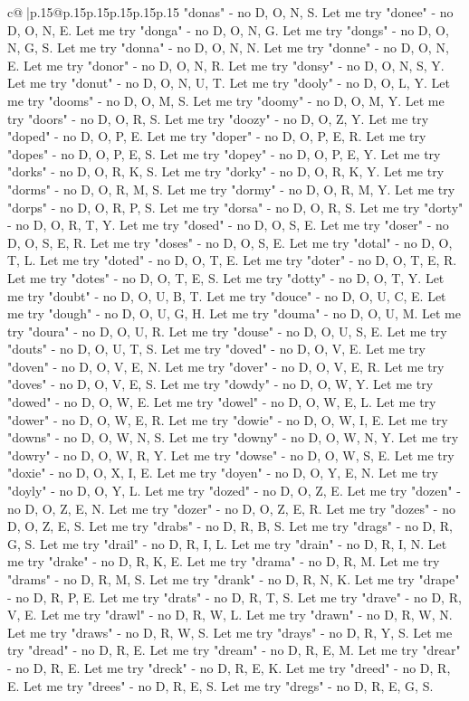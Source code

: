 \documentclass{article}
\begin{document}
{\begin{supertabular}{c@{$\;$}|p{.15\linewidth}@{}p{.15\linewidth}p{.15\linewidth}p{.15\linewidth}p{.15\linewidth}p{.15\linewidth}}
{{{"donas" {-} no D, O, N, S. Let me try "donee" {-} no D, O, N, E. Let me try "donga" {-} no D, O, N, G. Let me try "dongs" {-} no D, O, N, G, S. Let me try "donna" {-} no D, O, N, N. Let me try "donne" {-} no D, O, N, E. Let me try "donor" {-} no D, O, N, R. Let me try "donsy" {-} no D, O, N, S, Y. Let me try "donut" {-} no D, O, N, U, T. Let me try "dooly" {-} no D, O, L, Y. Let me try "dooms" {-} no D, O, M, S. Let me try "doomy" {-} no D, O, M, Y. Let me try "doors" {-} no D, O, R, S. Let me try "doozy" {-} no D, O, Z, Y. Let me try "doped" {-} no D, O, P, E. Let me try "doper" {-} no D, O, P, E, R. Let me try "dopes" {-} no D, O, P, E, S. Let me try "dopey" {-} no D, O, P, E, Y. Let me try "dorks" {-} no D, O, R, K, S. Let me try "dorky" {-} no D, O, R, K, Y. Let me try "dorms" {-} no D, O, R, M, S. Let me try "dormy" {-} no D, O, R, M, Y. Let me try "dorps" {-} no D, O, R, P, S. Let me try "dorsa" {-} no D, O, R, S. Let me try "dorty" {-} no D, O, R, T, Y. Let me try "dosed" {-} no D, O, S, E. Let me try "doser" {-} no D, O, S, E, R. Let me try "doses" {-} no D, O, S, E. Let me try "dotal" {-} no D, O, T, L. Let me try "doted" {-} no D, O, T, E. Let me try "doter" {-} no D, O, T, E, R. Let me try "dotes" {-} no D, O, T, E, S. Let me try "dotty" {-} no D, O, T, Y. Let me try "doubt" {-} no D, O, U, B, T. Let me try "douce" {-} no D, O, U, C, E. Let me try "dough" {-} no D, O, U, G, H. Let me try "douma" {-} no D, O, U, M. Let me try "doura" {-} no D, O, U, R. Let me try "douse" {-} no D, O, U, S, E. Let me try "douts" {-} no D, O, U, T, S. Let me try "doved" {-} no D, O, V, E. Let me try "doven" {-} no D, O, V, E, N. Let me try "dover" {-} no D, O, V, E, R. Let me try "doves" {-} no D, O, V, E, S. Let me try "dowdy" {-} no D, O, W, Y. Let me try "dowed" {-} no D, O, W, E. Let me try "dowel" {-} no D, O, W, E, L. Let me try "dower" {-} no D, O, W, E, R. Let me try "dowie" {-} no D, O, W, I, E. Let me try "downs" {-} no D, O, W, N, S. Let me try "downy" {-} no D, O, W, N, Y. Let me try "dowry" {-} no D, O, W, R, Y. Let me try "dowse" {-} no D, O, W, S, E. Let me try "doxie" {-} no D, O, X, I, E. Let me try "doyen" {-} no D, O, Y, E, N. Let me try "doyly" {-} no D, O, Y, L. Let me try "dozed" {-} no D, O, Z, E. Let me try "dozen" {-} no D, O, Z, E, N. Let me try "dozer" {-} no D, O, Z, E, R. Let me try "dozes" {-} no D, O, Z, E, S. Let me try "drabs" {-} no D, R, B, S. Let me try "drags" {-} no D, R, G, S. Let me try "drail" {-} no D, R, I, L. Let me try "drain" {-} no D, R, I, N. Let me try "drake" {-} no D, R, K, E. Let me try "drama" {-} no D, R, M. Let me try "drams" {-} no D, R, M, S. Let me try "drank" {-} no D, R, N, K. Let me try "drape" {-} no D, R, P, E. Let me try "drats" {-} no D, R, T, S. Let me try "drave" {-} no D, R, V, E. Let me try "drawl" {-} no D, R, W, L. Let me try "drawn" {-} no D, R, W, N. Let me try "draws" {-} no D, R, W, S. Let me try "drays" {-} no D, R, Y, S. Let me try "dread" {-} no D, R, E. Let me try "dream" {-} no D, R, E, M. Let me try "drear" {-} no D, R, E. Let me try "dreck" {-} no D, R, E, K. Let me try "dreed" {-} no D, R, E. Let me try "drees" {-} no D, R, E, S. Let me try "dregs" {-} no D, R, E, G, S. }}}
\end{supertabular}}
\end{document}
